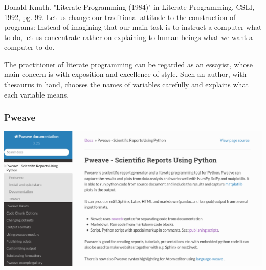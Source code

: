 \documentclass{beamer}
\begin{document}
\begin{frame}
  \frametitle{}
  \begin{center}
    \begin{block}
      {Donald Knuth. "Literate Programming (1984)" in Literate Programming. CSLI, 1992, pg. 99.}
      Let us change our traditional attitude to the construction of programs: Instead of imagining that our main task is to instruct a computer what to do, let us concentrate rather on explaining to human beings what we want a computer to do.
      
      The practitioner of literate programming can be regarded as an essayist, whose main concern is with exposition and excellence of style. Such an author, with thesaurus in hand, chooses the names of variables carefully and explains what each variable means.
    \end{block}
  \end{center}
\end{frame}

\begin{frame}
  \frametitle{Pweave}
  \begin{center}
    \includegraphics[width=\textwidth]{pweave.png}
  \end{center}
\end{frame}
\end{document}
